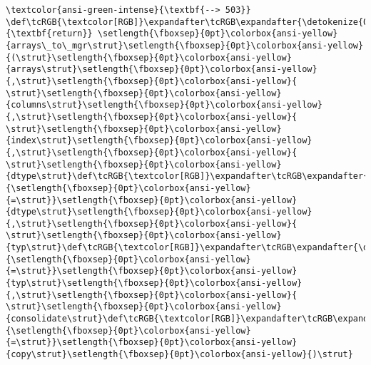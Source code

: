 \documentclass[11pt]{article}
\begin{document}
\begin{Verbatim}[commandchars=\\\{\}, frame=single, framerule=2mm, rulecolor=\color{outerrorbackground}]
\textcolor{ansi-green-intense}{\textbf{--> 503}} \def\tcRGB{\textcolor[RGB]}\expandafter\tcRGB\expandafter{\detokenize{0,135,0}}{\textbf{return}} \setlength{\fboxsep}{0pt}\colorbox{ansi-yellow}{arrays\_to\_mgr\strut}\setlength{\fboxsep}{0pt}\colorbox{ansi-yellow}{(\strut}\setlength{\fboxsep}{0pt}\colorbox{ansi-yellow}{arrays\strut}\setlength{\fboxsep}{0pt}\colorbox{ansi-yellow}{,\strut}\setlength{\fboxsep}{0pt}\colorbox{ansi-yellow}{ \strut}\setlength{\fboxsep}{0pt}\colorbox{ansi-yellow}{columns\strut}\setlength{\fboxsep}{0pt}\colorbox{ansi-yellow}{,\strut}\setlength{\fboxsep}{0pt}\colorbox{ansi-yellow}{ \strut}\setlength{\fboxsep}{0pt}\colorbox{ansi-yellow}{index\strut}\setlength{\fboxsep}{0pt}\colorbox{ansi-yellow}{,\strut}\setlength{\fboxsep}{0pt}\colorbox{ansi-yellow}{ \strut}\setlength{\fboxsep}{0pt}\colorbox{ansi-yellow}{dtype\strut}\def\tcRGB{\textcolor[RGB]}\expandafter\tcRGB\expandafter{\detokenize{98,98,98}}{\setlength{\fboxsep}{0pt}\colorbox{ansi-yellow}{=\strut}}\setlength{\fboxsep}{0pt}\colorbox{ansi-yellow}{dtype\strut}\setlength{\fboxsep}{0pt}\colorbox{ansi-yellow}{,\strut}\setlength{\fboxsep}{0pt}\colorbox{ansi-yellow}{ \strut}\setlength{\fboxsep}{0pt}\colorbox{ansi-yellow}{typ\strut}\def\tcRGB{\textcolor[RGB]}\expandafter\tcRGB\expandafter{\detokenize{98,98,98}}{\setlength{\fboxsep}{0pt}\colorbox{ansi-yellow}{=\strut}}\setlength{\fboxsep}{0pt}\colorbox{ansi-yellow}{typ\strut}\setlength{\fboxsep}{0pt}\colorbox{ansi-yellow}{,\strut}\setlength{\fboxsep}{0pt}\colorbox{ansi-yellow}{ \strut}\setlength{\fboxsep}{0pt}\colorbox{ansi-yellow}{consolidate\strut}\def\tcRGB{\textcolor[RGB]}\expandafter\tcRGB\expandafter{\detokenize{98,98,98}}{\setlength{\fboxsep}{0pt}\colorbox{ansi-yellow}{=\strut}}\setlength{\fboxsep}{0pt}\colorbox{ansi-yellow}{copy\strut}\setlength{\fboxsep}{0pt}\colorbox{ansi-yellow}{)\strut}


\end{Verbatim}
\end{document}

